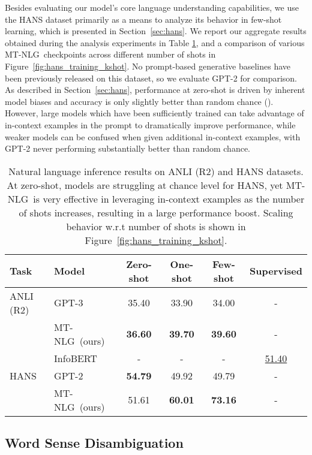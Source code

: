 \documentclass[11pt]{article}
\newcommand{\ours}{MT-NLG}
\begin{document}
Besides evaluating our model's core language understanding capabilities, we use the HANS dataset primarily as a means to analyze its behavior in few-shot learning, which is presented in Section~\ref{sec:hans}. We report our aggregate results obtained during the analysis experiments in Table \ref{tab:nli-perf}, and a comparison of various \ours~checkpoints across different number of shots in Figure~\ref{fig:hans_training_kshot}. No prompt-based generative baselines have been previously released on this dataset, so we evaluate GPT-2 for comparison. As described in Section~\ref{sec:hans}, performance at zero-shot is driven by inherent model biases and accuracy is only slightly better than random chance (). However, large models which have been sufficiently trained can take advantage of in-context examples in the prompt to dramatically improve performance, while weaker models can be confused when given additional in-context examples, with GPT-2 never performing substantially better than random chance.





\begin{table}[t]
\centering
\small
\begin{tabular}{l l c c c c}
 \toprule
 \textbf{Task} & \textbf{Model} &  \textbf{Zero-shot}  &  \textbf{One-shot} &  \textbf{Few-shot} & \textbf{Supervised} \\
 \midrule
 ANLI (R2) & GPT-3	&	35.40	&	33.90	&	34.00 & -	\\
           & \ours~(ours)  &   \textbf{36.60}   &   \textbf{39.70}   &   \textbf{39.60} & -  \\
           \cmidrule{2-6}
           & InfoBERT & - & - & - & \underline{51.40} \\
 \midrule
 HANS & GPT-2 & \textbf{54.79}   &   49.92   &   49.79 & - \\
      & \ours~(ours) & {51.61}	&	\textbf{60.01}	&	\textbf{73.16} & -	\\
 \bottomrule
\end{tabular}
\caption{Natural language inference results on ANLI (R2) and HANS datasets. At zero-shot, models are struggling at chance level for HANS, yet \ours~is very effective in leveraging in-context examples as the number of shots increases, resulting in a large performance boost. Scaling behavior w.r.t number of shots is shown in Figure~\ref{fig:hans_training_kshot}.
}
\label{tab:nli-perf}
\end{table}

\subsection{Word Sense Disambiguation}
\end{document}
